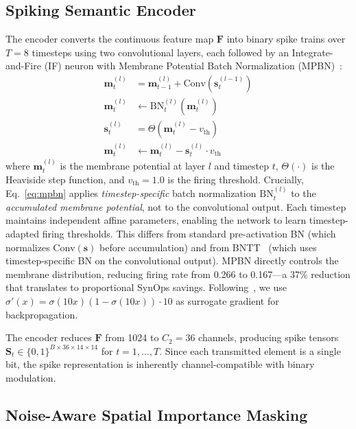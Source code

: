 \documentclass[conference]{IEEEtran}
\begin{document}
\subsection{Spiking Semantic Encoder}

The encoder converts the continuous feature map $\mathbf{F}$ into binary spike trains over $T{=}8$ timesteps using two convolutional layers, each followed by an Integrate-and-Fire (IF) neuron with Membrane Potential Batch Normalization (MPBN)~\cite{guo2023mpbn}:
\begin{align}
    \mathbf{m}_t^{(l)} &= \mathbf{m}_{t-1}^{(l)} + \text{Conv}(\mathbf{s}_{t}^{(l-1)}) \label{eq:membrane}\\
    \mathbf{m}_t^{(l)} &\leftarrow \text{BN}_t^{(l)}(\mathbf{m}_t^{(l)}) \label{eq:mpbn}\\
    \mathbf{s}_t^{(l)} &= \Theta(\mathbf{m}_t^{(l)} - v_{\text{th}}) \label{eq:spike}\\
    \mathbf{m}_t^{(l)} &\leftarrow \mathbf{m}_t^{(l)} - \mathbf{s}_t^{(l)} \cdot v_{\text{th}} \label{eq:reset}
\end{align}
where $\mathbf{m}_t^{(l)}$ is the membrane potential at layer $l$ and timestep $t$, $\Theta(\cdot)$ is the Heaviside step function, and $v_{\text{th}} = 1.0$ is the firing threshold. Crucially, Eq.~\eqref{eq:mpbn} applies \emph{timestep-specific} batch normalization $\text{BN}_t^{(l)}$ to the \emph{accumulated membrane potential}, not to the convolutional output. Each timestep maintains independent affine parameters, enabling the network to learn timestep-adapted firing thresholds. This differs from standard pre-activation BN (which normalizes $\text{Conv}(\mathbf{s})$ before accumulation) and from BNTT~\cite{kim2022bntt} (which uses timestep-specific BN on the convolutional output). MPBN directly controls the membrane distribution, reducing firing rate from 0.266 to 0.167---a 37\% reduction that translates to proportional SynOps savings. Following~\cite{neftci2019surrogate}, we use $\sigma'(x) = \sigma(10x)(1-\sigma(10x)) \cdot 10$ as surrogate gradient for backpropagation.

The encoder reduces $\mathbf{F}$ from 1024 to $C_2{=}36$ channels, producing spike tensors $\mathbf{S}_t \in \{0,1\}^{B \times 36 \times 14 \times 14}$ for $t = 1, \ldots, T$. Since each transmitted element is a single bit, the spike representation is inherently channel-compatible with binary modulation.

\subsection{Noise-Aware Spatial Importance Masking}
\end{document}
